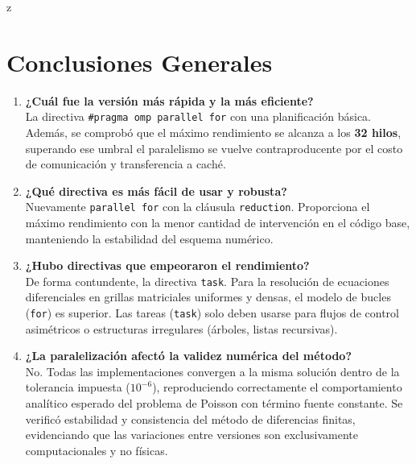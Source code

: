 z\documentclass[11pt,a4paper]{article}
\begin{document}
\section*{Conclusiones Generales}
\begin{enumerate}
    \item \textbf{¿Cuál fue la versión más rápida y la más eficiente?} \\
    La directiva \texttt{\#pragma omp parallel for} con una planificación básica. Además, se comprobó que el máximo rendimiento se alcanza a los \textbf{32 hilos}, superando ese umbral el paralelismo se vuelve contraproducente por el costo de comunicación y transferencia a caché.

    \item \textbf{¿Qué directiva es más fácil de usar y robusta?} \\
    Nuevamente \texttt{parallel for} con la cláusula \texttt{reduction}. Proporciona el máximo rendimiento con la menor cantidad de intervención en el código base, manteniendo la estabilidad del esquema numérico.

    \item \textbf{¿Hubo directivas que empeoraron el rendimiento?} \\
    De forma contundente, la directiva \texttt{task}. Para la resolución de ecuaciones diferenciales en grillas matriciales uniformes y densas, el modelo de bucles (\texttt{for}) es superior. Las tareas (\texttt{task}) solo deben usarse para flujos de control asimétricos o estructuras irregulares (árboles, listas recursivas).

    \item \textbf{¿La paralelización afectó la validez numérica del método?} \\
    No. Todas las implementaciones convergen a la misma solución dentro de la tolerancia impuesta ($10^{-6}$), reproduciendo correctamente el comportamiento analítico esperado del problema de Poisson con término fuente constante. Se verificó estabilidad y consistencia del método de diferencias finitas, evidenciando que las variaciones entre versiones son exclusivamente computacionales y no físicas.
\end{enumerate}
\end{document}
